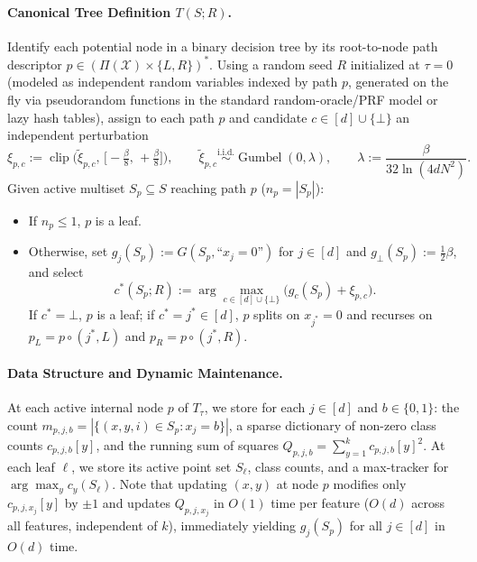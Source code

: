 \documentclass[11pt]{article}
\theoremstyle{definition}
\newcommand{\calX}{\mathcal{X}}
\newcommand{\Gumbel}{\operatorname{Gumbel}}
\newcommand{\clip}{\operatorname{clip}}
\begin{document}
\paragraph{Canonical Tree Definition $T(S; R)$.}
Identify each potential node in a binary decision tree by its root-to-node path descriptor $p \in (\Pi(\calX) \times \{L, R\})^*$. Using a random seed $R$ initialized at $\tau = 0$ (modeled as independent random variables indexed by path $p$, generated on the fly via pseudorandom functions in the standard random-oracle/PRF model or lazy hash tables), assign to each path $p$ and candidate $c \in [d] \cup \{\bot\}$ an independent perturbation
\[
    \xi_{p, c} := \clip\Big(\tilde{\xi}_{p, c}, \, \big[-\tfrac{\beta}{8}, \, +\tfrac{\beta}{8}\big]\Big), \qquad \tilde{\xi}_{p, c} \stackrel{\text{i.i.d.}}{\sim} \Gumbel(0, \lambda), \qquad \lambda := \frac{\beta}{32 \ln(4 d N^2)}.
\]
Given active multiset $S_p \subseteq S$ reaching path $p$ ($n_p = |S_p|$):
\begin{itemize}[leftmargin=1.5em,itemsep=2pt]
    \item If $n_p \le 1$, $p$ is a leaf.
    \item Otherwise, set $g_j(S_p) := G(S_p, \text{``}x_j = 0\text{''})$ for $j \in [d]$ and $g_\bot(S_p) := \frac{1}{2}\beta$, and select
    \[
        c^*(S_p; R) := \arg\max_{c \in [d] \cup \{\bot\}} \big(g_c(S_p) + \xi_{p, c}\big).
    \]
    If $c^* = \bot$, $p$ is a leaf; if $c^* = j^* \in [d]$, $p$ splits on $x_{j^*} = 0$ and recurses on $p_L = p \circ (j^*, L)$ and $p_R = p \circ (j^*, R)$.
\end{itemize}

\paragraph{Data Structure and Dynamic Maintenance.}
At each active internal node $p$ of $T_\tau$, we store for each $j \in [d]$ and $b \in \{0, 1\}$: the count $m_{p, j, b} = |\{(x, y, i) \in S_p : x_j = b\}|$, a sparse dictionary of non-zero class counts $c_{p, j, b}[y]$, and the running sum of squares $Q_{p, j, b} = \sum_{y=1}^k c_{p, j, b}[y]^2$. At each leaf $\ell$, we store its active point set $S_\ell$, class counts, and a max-tracker for $\arg\max_y c_y(S_\ell)$. Note that updating $(x, y)$ at node $p$ modifies only $c_{p, j, x_j}[y]$ by $\pm 1$ and updates $Q_{p, j, x_j}$ in $O(1)$ time per feature ($O(d)$ across all features, independent of $k$), immediately yielding $g_j(S_p)$ for all $j \in [d]$ in $O(d)$ time.
\end{document}
